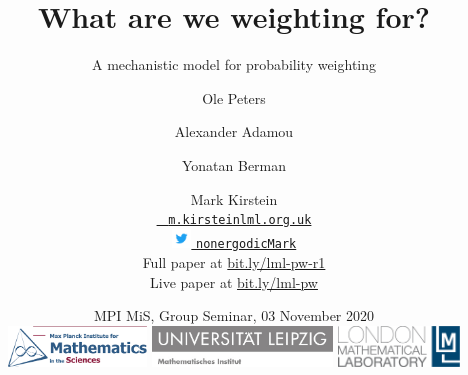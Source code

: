 \title[\insertlogo\\
\vspace{.5em}
\lmlblue{Mark Kirstein}]{\textbf{
What are we weighting for?
}}
\subtitle{A mechanistic model for probability weighting}


\author[M Kirstein]{
Ole Peters \and Alexander Adamou \and Yonatan Berman \and Mark Kirstein\\
\vspace{.5em}
{\small
\href{mailto:m.kirstein@lml.org.uk}{\Letter ~ \texttt{m.kirstein{\MVAt}lml.org.uk}} \\
\href{https://twitter.com/nonergodicMark}{\includegraphics[height=1.4em,valign=c]{img/Twitter_Logo_Blue} \MVAt \texttt{nonergodicMark}}} \\
\vspace{1em}
Full paper at \url{bit.ly/lml-pw-r1}\\
Live paper at \url{bit.ly/lml-pw}
}

\date[02 Nov 2020]{
MPI MiS, Group Seminar, 03 November 2020\\
\vspace{1em}
\href{https://www.mis.mpg.de/jjost/research/economics.html}{\includegraphics[height=1.1cm]{img/MPIMIS_en.png}}
\hfill
\href{https://www.math.uni-leipzig.de/cms/de/forschung/abteilungen/wima/}{\includegraphics[height=1.1cm]{img/Uni_Leipzig_MathemInstitut.jpg}}
\hfill
\href{http://lml.org.uk}{
\includegraphics[height=1.1cm]{img/LML_LOGO_whiteBG.jpg}}
}
